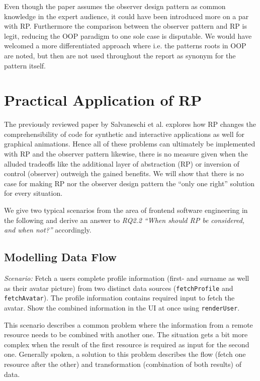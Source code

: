 \documentclass[12pt,a4paper]{article}
\begin{document}
Even though the paper assumes the observer design pattern as common knowledge in the expert audience, it could have been introduced more on a par with RP. Furthermore the comparison between the observer pattern and RP is legit, reducing the OOP paradigm to one sole case is disputable. We would have welcomed a more differentiated approach where i.e. the patterns roots in OOP are noted, but then are not used throughout the report as synonym for the pattern itself.

\section{Practical Application of RP}

The previously reviewed paper by Salvaneschi et al. explores how RP changes the comprehensibility of code for synthetic and interactive applications as well for graphical animations. Hence all of these problems can ultimately be implemented with RP and the observer pattern likewise, there is no measure given when the alluded tradeoffs like the additional layer of abstraction (RP) or inversion of control (observer) outweigh the gained benefits. We will show that there is no case for making RP nor the observer design pattern the ``only one right'' solution for every situation.

We give two typical scenarios from the area of frontend software engineering in the following and derive an answer to \emph{RQ2.2 ``When should RP be considered, and when not?''} accordingly.

\subsection{Modelling Data Flow}

\begin{framed}
	\noindent\emph{Scenario:} Fetch a users complete profile information (first- and surname as well as their avatar picture) from two distinct data sources (\texttt{fetchProfile} and \texttt{fetchAvatar}). The profile information contains required input to fetch the avatar. Show the combined information in the UI at once using \texttt{renderUser}.
\end{framed}

This scenario describes a common problem where the information from a remote resource needs to be combined with another one. The situation gets a bit more complex when the result of the first resource is required as input for the second one. Generally spoken, a solution to this problem describes the flow (fetch one resource after the other) and transformation (combination of both results) of data.
\end{document}
